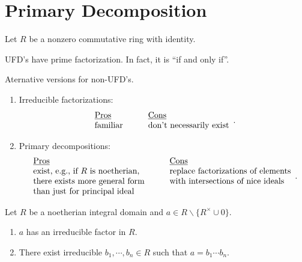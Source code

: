\chapter{Primary Decomposition}

Let $R$ be a nonzero commutative ring with identity.

\begin{discussion}\label{4.1}
    UFD's have prime factorization. In fact, it is ``if and only if''. \par 
    Aternative versions for non-UFD's.
    \begin{enumerate}
        \item Irreducible factorizations: 
            \[
                \begin{array}{llll}
                    \text{\underline{Pros}} &&& \text{\underline{Cons}} \\
                    \text{familiar} &&& \text{don't necessarily exist} 
                \end{array}.
            \]
        \item 
            Primary decompositions:
            \[
                \begin{array}{llll}
                    \text{\underline{Pros}} &&& \text{\underline{Cons}} \\
                    \text{exist, e.g., if $R$ is noetherian,} &&& \text{replace factorizations of elements} \\
                    \text{there exists more general form} &&& \text{with intersections of nice ideals} \\
                    \text{than just for principal ideal}
                \end{array}.
            \]
    \end{enumerate}
\end{discussion}

\begin{theorem}\label{4.2}
    Let $R$ be a noetherian integral domain and $a \in R \smallsetminus \{R^{\times} \cup 0\}$.
    \begin{enumerate}
        \item\label{4.2a} $a$ has an irreducible factor in $R$.
        \item\label{4.2b} There exist irreducible $b_1,\cdots,b_n \in R$ such that $a = b_1 \cdots b_n$.
    \end{enumerate}
\end{theorem}


